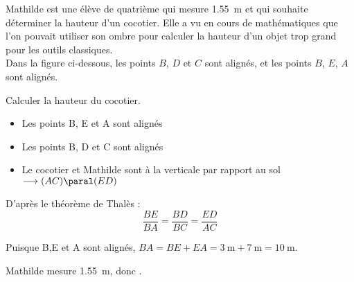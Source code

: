 \documentclass[../Cours.tex]{subfiles}
\begin{document}
\begin{questions}
\exercice
Mathilde est une élève de quatrième qui mesure \qty{1.55}{\metre} et qui souhaite déterminer la hauteur d'un cocotier. Elle a vu en cours de mathématiques que l'on pouvait utiliser son ombre pour calculer la hauteur d'un objet trop grand pour les outils classiques.\\ 

Dans la figure ci-dessous, les points $B$, $D$ et $C$ sont alignés, et les points $B$, $E$, $A$ sont alignés.

\begin{center}
\end{center}

\question Calculer la hauteur du cocotier.

{\color{rouge}
\begin{itemize}
    \item Les points B, E et A sont alignés
    \item Les points B, D et C sont alignés
    \item Le cocotier et Mathilde sont à la verticale par rapport au sol $\longrightarrow (AC) \paral (ED)$
\end{itemize}

D'après le théorème de Thalès :
\[ \frac{BE}{BA} = \frac{BD}{BC} = \frac{ED}{AC} \]

Puisque B,E et A sont alignés, $BA = BE + EA = \qty{3}{\metre} + \qty{7}{\metre} = \qty{10}{\metre}$. 

Mathilde mesure \qty{1.55}{\metre}, donc .

}
\end{questions}
\end{document}
